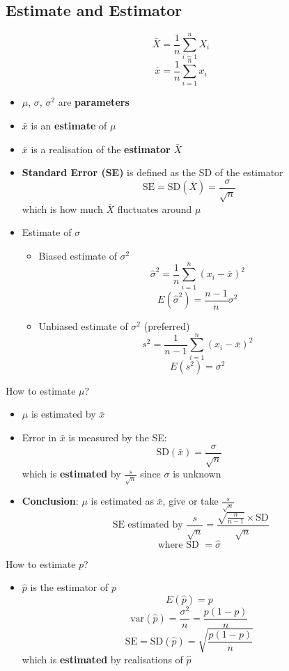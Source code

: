 \documentclass{article}
\begin{document}
\begin{multicols}{2}
\subsection{Estimate and Estimator}
$$\bar{X} = \frac{1}{n}\sum_{i=1}^{n}X_i$$
$$\bar{x} = \frac{1}{n}\sum_{i=1}^{n}x_i$$
\begin{itemize}
	\item $\mu$, $\sigma$, $\sigma^2$ are \textbf{parameters}
	\item $\bar{x}$ is an \textbf{estimate} of $\mu$
	\item $\bar{x}$ is a realisation of the \textbf{estimator} $\bar{X}$
	\item \textbf{Standard Error (SE)} is defined as the SD of the estimator
	$$\text{SE} = \text{SD}(\bar{X}) = \frac{\sigma}{\sqrt{n}}$$
	which is how much $\bar{X}$ fluctuates around $\mu$
	\item Estimate of $\sigma$
	\begin{itemize}
		\item Biased estimate of $\sigma^2$
		$$\hat{\sigma}^2 = \frac{1}{n}\sum_{i=1}^{n}(x_i-\bar{x})^2$$
		$$E(\hat{\sigma}^2) = \frac{n-1}{n}\sigma^2$$
		\item Unbiased estimate of $\sigma^2$ (preferred)
		$$s^2 = \frac{1}{n-1}\sum_{i=1}^{n}(x_i-\bar{x})^2$$
		$$E(s^2) = \sigma^2$$
	\end{itemize}

\end{itemize}
How to estimate $\mu$?
\begin{itemize}
	\item $\mu$ is estimated by $\bar{x}$
	\item Error in $\bar{x}$ is measured by the SE: $$\text{SD}(\bar{x})=\frac{\sigma}{\sqrt{n}}$$ which is \textbf{estimated} by $\frac{s}{\sqrt{n}}$ since $\sigma$ is unknown
	\item \textbf{Conclusion}: $\mu$ is estimated as $\bar{x}$, give or take $\frac{s}{\sqrt{n}}$
	$$ \text{ SE estimated by } \frac{s}{\sqrt{n}} = \frac{\sqrt{\frac{n}{n-1}}\times \text{SD} }{\sqrt{n}}$$
	$$\text{where SD } = \hat{\sigma}$$
\end{itemize}
How to estimate $p$?
\begin{itemize}
	\item $\hat{p}$ is the estimator of $p$
	$$E(\hat{p}) = p$$
	$$\text{var}(\hat{p}) = \frac{\sigma^2}{n} = \frac{p(1-p)}{n}$$
	$$\text{SE} = \text{SD}(\hat{p}) = \sqrt{\frac{p(1-p)}{n}}$$
	which is \textbf{estimated }by realisations of $\hat{p}$
\end{itemize}

\end{multicols}
\end{document}
